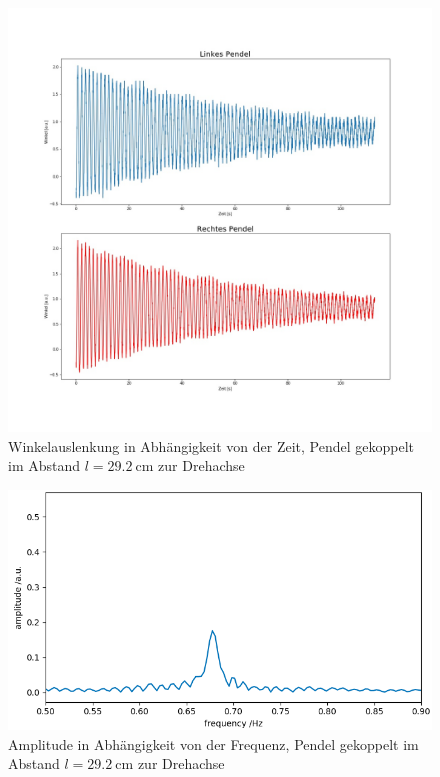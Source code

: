 \begin{figure}[H]
	\centering
	\includegraphics[height = 0.5 \textheight]{figures/211-13.jpeg}
	\caption{Winkelauslenkung in Abhängigkeit von der Zeit, Pendel gekoppelt im Abstand $l = \SI{29,2}{\cm}$ zur Drehachse}
\end{figure}
\begin{figure}[H]
	\centering
	\includegraphics[height = 0.23 \textheight]{figures/211-14.jpeg}
	\caption{Amplitude in Abhängigkeit von der Frequenz, Pendel gekoppelt im Abstand $l = \SI{29,2}{\cm}$ zur Drehachse}
\end{figure}

